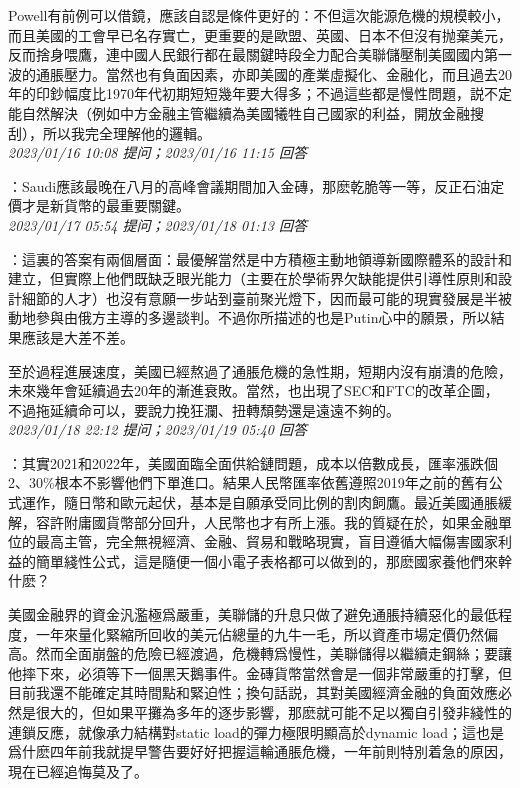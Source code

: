 \documentclass[twocolumn]{ctexart}
\begin{document}
Powell有前例可以借鏡，應該自認是條件更好的：不但這次能源危機的規模較小，而且美國的工會早已名存實亡，更重要的是歐盟、英國、日本不但沒有抛棄美元，反而捨身喂鷹，連中國人民銀行都在最關鍵時段全力配合美聯儲壓制美國國内第一波的通脹壓力。當然也有負面因素，亦即美國的產業虛擬化、金融化，而且過去20年的印鈔幅度比1970年代初期短短幾年要大得多；不過這些都是慢性問題，説不定能自然解決（例如中方金融主管繼續為美國犧牲自己國家的利益，開放金融搜刮），所以我完全理解他的邏輯。
\\

\textit{\hfill\noindent\small 2023/01/16 10:08 提问；2023/01/16 11:15 回答}

：Saudi應該最晚在八月的高峰會議期間加入金磚，那麽乾脆等一等，反正石油定價才是新貨幣的最重要關鍵。
\\

\textit{\hfill\noindent\small 2023/01/17 05:54 提问；2023/01/18 01:13 回答}

：這裏的答案有兩個層面：最優解當然是中方積極主動地領導新國際體系的設計和建立，但實際上他們既缺乏眼光能力（主要在於學術界欠缺能提供引導性原則和設計細節的人才）也沒有意願一步站到臺前聚光燈下，因而最可能的現實發展是半被動地參與由俄方主導的多邊談判。不過你所描述的也是Putin心中的願景，所以結果應該是大差不差。

至於過程進展速度，美國已經熬過了通脹危機的急性期，短期内沒有崩潰的危險，未來幾年會延續過去20年的漸進衰敗。當然，也出現了SEC和FTC的改革企圖，不過拖延續命可以，要說力挽狂瀾、扭轉頹勢還是遠遠不夠的。
\\

\textit{\hfill\noindent\small 2023/01/18 22:12 提问；2023/01/19 05:40 回答}

：其實2021和2022年，美國面臨全面供給鏈問題，成本以倍數成長，匯率漲跌個2、30\%根本不影響他們下單進口。結果人民幣匯率依舊遵照2019年之前的舊有公式運作，隨日幣和歐元起伏，基本是自願承受同比例的割肉飼鷹。最近美國通脹緩解，容許附庸國貨幣部分回升，人民幣也才有所上漲。我的質疑在於，如果金融單位的最高主管，完全無視經濟、金融、貿易和戰略現實，盲目遵循大幅傷害國家利益的簡單綫性公式，這是隨便一個小電子表格都可以做到的，那麽國家養他們來幹什麽？

美國金融界的資金汎濫極爲嚴重，美聯儲的升息只做了避免通脹持續惡化的最低程度，一年來量化緊縮所回收的美元佔總量的九牛一毛，所以資產市場定價仍然偏高。然而全面崩盤的危險已經渡過，危機轉爲慢性，美聯儲得以繼續走鋼絲；要讓他摔下來，必須等下一個黑天鵝事件。金磚貨幣當然會是一個非常嚴重的打擊，但目前我還不能確定其時間點和緊迫性；換句話説，其對美國經濟金融的負面效應必然是很大的，但如果平攤為多年的逐步影響，那麽就可能不足以獨自引發非綫性的連鎖反應，就像承力結構對static load的彈力極限明顯高於dynamic load；這也是爲什麽四年前我就提早警告要好好把握這輪通脹危機，一年前則特別着急的原因，現在已經追悔莫及了。
\\
\end{document}
